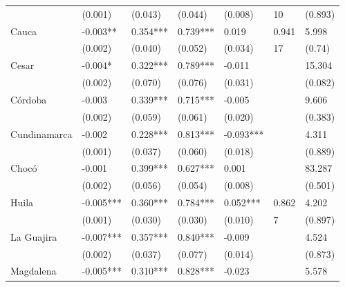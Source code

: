 \begin{table}[H]
\begin{tabular}{lllllll}
& \scriptsize{(0.001)} & \scriptsize{(0.043)} & \scriptsize{(0.044)} & \scriptsize{(0.008)} & \scriptsize{10}    & \scriptsize{(0.893)} \\
\vspace{-0.3cm} Cauca & -0.003** & 0.354*** & 0.739*** & 0.019 & 0.941 & 5.998\\   
& \scriptsize{(0.002)} & \scriptsize{(0.040)} & \scriptsize{(0.052)} & \scriptsize{(0.034)} & \scriptsize{17}    & \scriptsize{(0.74)} \\
\vspace{-0.3cm} Cesar & -0.004* & 0.322*** & 0.789*** & -0.011 &       & 15.304\\   
& \scriptsize{(0.002)} & \scriptsize{(0.070)} & \scriptsize{(0.076)} & \scriptsize{(0.031)} &       & \scriptsize{(0.082)} \\
\vspace{-0.3cm} Córdoba & -0.003 & 0.339*** & 0.715*** & -0.005 &       & 9.606\\   
& \scriptsize{(0.002)} & \scriptsize{(0.059)} & \scriptsize{(0.061)} & \scriptsize{(0.020)} &       & \scriptsize{(0.383)} \\
\vspace{-0.3cm} Cundinamarca & -0.002 & 0.228*** & 0.813*** & -0.093*** &       & 4.311\\   
& \scriptsize{(0.001)} & \scriptsize{(0.037)} & \scriptsize{(0.060)} & \scriptsize{(0.018)} &       & \scriptsize{(0.889)} \\
\vspace{-0.3cm} Chocó & -0.001 & 0.399*** & 0.627*** & 0.001 &       & 83.287\\   
& \scriptsize{(0.002)} & \scriptsize{(0.056)} & \scriptsize{(0.054)} & \scriptsize{(0.008)} &       & \scriptsize{(0.501)} \\
\vspace{-0.3cm} Huila & -0.005*** & 0.360*** & 0.784*** & 0.052*** & 0.862 & 4.202\\   
& \scriptsize{(0.001)} & \scriptsize{(0.030)} & \scriptsize{(0.030)} & \scriptsize{(0.010)} &  \scriptsize{7}    & \scriptsize{(0.897)} \\
\vspace{-0.3cm} La Guajira & -0.007*** & 0.357*** & 0.840*** & -0.009 &       & 4.524\\   
& \scriptsize{(0.002)} & \scriptsize{(0.037)} & \scriptsize{(0.077)} & \scriptsize{(0.014)} &       & \scriptsize{(0.873)} \\
\vspace{-0.3cm} Magdalena & -0.005*** & 	0.310*** &	0.828*** &	-0.023 &  & 5.578\\   

\end{tabular}
\end{table}
